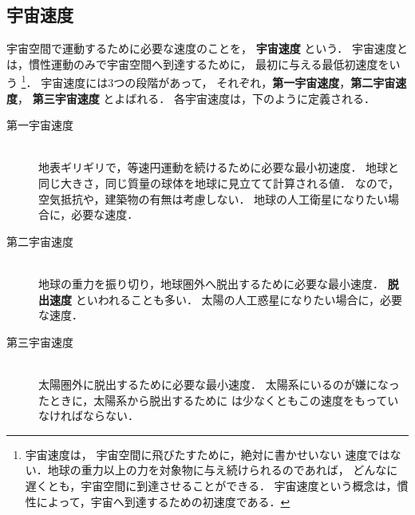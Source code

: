         \subsection{宇宙速度}
            宇宙空間で運動するために必要な速度のことを，
            \textbf{宇宙速度} という．
            宇宙速度とは，慣性運動のみで宇宙空間へ到達するために，
            最初に与える最低初速度をいう
                \footnote{
                    宇宙速度は，
                    宇宙空間に飛びたすために，絶対に書かせいない
                    速度ではない．地球の重力以上の力を対象物に与え続けられるのであれば，
                    どんなに遅くとも，宇宙空間に到達させることができる．
                    宇宙速度という概念は，慣性によって，宇宙へ到達するための初速度である．
                }．
            宇宙速度には3つの段階があって，
            それぞれ，\textbf{第一宇宙速度}，\textbf{第二宇宙速度}，
            \textbf{第三宇宙速度} とよばれる．
            各宇宙速度は，下のように定義される．
            \begin{description}
                \item[第一宇宙速度]\mbox{}\\
                    地表ギリギリで，等速円運動を続けるために必要な最小初速度．
                    地球と同じ大きさ，同じ質量の球体を地球に見立てて計算される値．
                    なので，空気抵抗や，建築物の有無は考慮しない．
                    地球の人工衛星になりたい場合に，必要な速度．
                \item[第二宇宙速度]\mbox{}\\
                    地球の重力を振り切り，地球圏外へ脱出するために必要な最小速度．
                    \textbf{脱出速度} といわれることも多い．
                    太陽の人工惑星になりたい場合に，必要な速度．
                \item[第三宇宙速度]\mbox{}\\
                    太陽圏外に脱出するために必要な最小速度．
                    太陽系にいるのが嫌になったときに，太陽系から脱出するために
                    は少なくともこの速度をもっていなければならない．
            \end{description}

